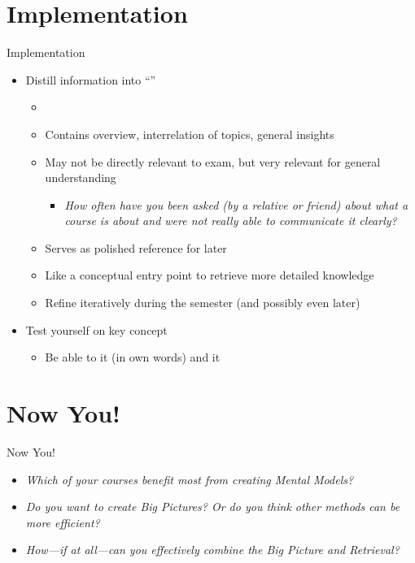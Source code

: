 \documentclass{ercisbeamer}
\begin{document}
\section{Implementation}
\begin{frame}{Implementation}
    \begin{tbox}
        \begin{itemize}
            \item Distill information into ``''
            \begin{itemize}
                \item {}
                \item Contains overview, interrelation of topics, general insights
                \item May not be directly relevant to exam, but very relevant for general understanding
                \begin{itemize}
                    \item \emph{How often have you been asked (by a relative or friend) about what a course is about and were not really able to communicate it clearly?}
                \end{itemize}
                \item Serves as polished reference for later
                \item Like a conceptual entry point to retrieve more detailed knowledge
                \item Refine iteratively during the semester (and possibly even later)
            \end{itemize}
            \item Test yourself on key concept
            \begin{itemize}
                \item Be able to  it (in own words) and  it
            \end{itemize}
        \end{itemize}
    \end{tbox}
\end{frame}
\setbgimage{}


\section{Now You!}
\begin{frame}{Now You!}
    \begin{itemize}
        \item \emph{Which of your courses benefit most from creating Mental Models?}
        \item \emph{Do you want to create Big Pictures? Or do you think other methods can be more efficient?}
        \item \emph{How---if at all---can you effectively combine the Big Picture and Retrieval?}
    \end{itemize}
\end{frame}
\end{document}
